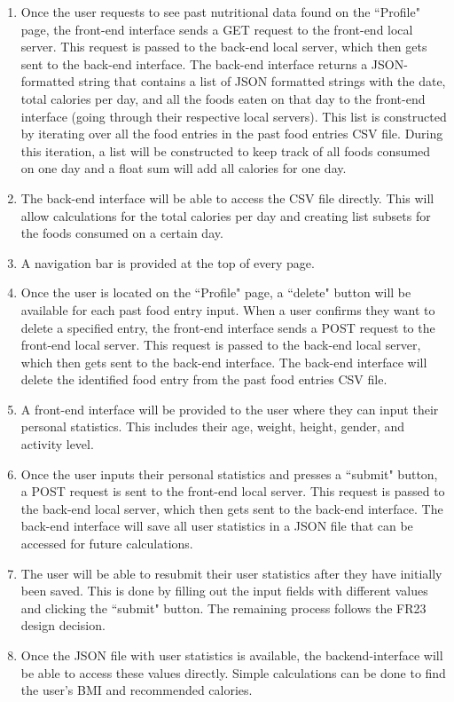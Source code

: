 \documentclass[12pt, titlepage]{article}
\begin{document}
\begin{enumerate}[{FR}1. ]
	\item Once the user requests to see past nutritional data found on the ``Profile" page, the front-end interface sends a GET request to the front-end local server. This request is passed to the back-end local server, which then gets sent to the back-end interface. The back-end interface returns a JSON-formatted string that contains a list of JSON formatted strings with the date, total calories per day, and all the foods eaten on that day to the front-end interface (going through their respective local servers). This list is constructed by iterating over all the food entries in the past food entries CSV file. During this iteration, a list will be constructed to keep track of all foods consumed on one day and a float sum will add all calories for one day.
	\item The back-end interface will be able to access the CSV file directly. This will allow calculations for the total calories per day and creating list subsets for the foods consumed on a certain day.
	\item A navigation bar is provided at the top of every page.
	\item Once the user is located on the ``Profile" page, a ``delete" button will be available for each past food entry input. When a user confirms they want to delete a specified entry, the front-end interface sends a POST request to the front-end local server. This request is passed to the back-end local server, which then gets sent to the back-end interface. The back-end interface will delete the identified food entry from the past food entries CSV file.
	\item A front-end interface will be provided to the user where they can input their personal statistics. This includes their age, weight, height, gender, and activity level.
	\item Once the user inputs their personal statistics and presses a ``submit" button, a POST request is sent to the front-end local server. This request is passed to the back-end local server, which then gets sent to the back-end interface. The back-end interface will save all user statistics in a JSON file that can be accessed for future calculations.
	\item The user will be able to resubmit their user statistics after they have initially been saved. This is done by filling out the input fields with different values and clicking the ``submit" button. The remaining process follows the FR23 design decision.
	\item Once the JSON file with user statistics is available, the backend-interface will be able to access these values directly. Simple calculations can be done to find the user's BMI and recommended calories.

\end{enumerate}
\end{document}
